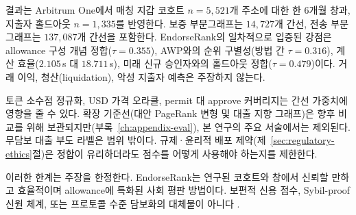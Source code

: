 
결과는 Arbitrum One에서 매칭 지갑 코호트 $n=5{,}521$개 주소에 대한 한 6개월 창과, 지출자 홀드아웃 $n=1{,}335$를 반영한다. 보증 부분그래프는 $14{,}727$개 간선, 전송 부분그래프는 $137{,}087$개 간선을 포함한다. EndorseRank의 일차적으로 입증된 강점은 allowance 구성 개념 정합($\tau=0.355$), AWP와의 순위 구별성(방법 간 $\tau=0.316$), 계산 효율($2.105$\,s 대 $18.711$\,s), 미래 신규 승인자와의 홀드아웃 정합($\tau=0.479$)이다. 거래 이익, 청산(liquidation), 악성 지출자 예측은 주장하지 않는다.

토큰 소수점 정규화, USD 가격 오라클, permit 대 approve 커버리지는 간선 가중치에 영향을 줄 수 있다. 확장 기준선(대안 PageRank 변형 및 대출 지향 그래프)은 향후 비교를 위해 보관되지만(부록~\ref{ch:appendix-eval}), 본 연구의 주요 서술에서는 제외된다. 무담보 대출 부도 라벨은 범위 밖이다. 규제·윤리적 배포 제약(제~\ref{sec:regulatory-ethics}절)은 정합이 유리하더라도 점수를 어떻게 사용해야 하는지를 제한한다.

이러한 한계는 주장을 한정한다. EndorseRank는 연구된 코호트와 창에서 신뢰할 만하고 효율적이며 allowance에 특화된 사회 평판 방법이다. 보편적 신용 점수, Sybil-proof 신원 체계, 또는 프로토콜 수준 담보화의 대체물이 아니다 .
